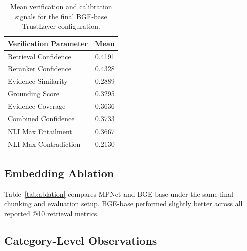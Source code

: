 \documentclass[11pt]{article}
\newcommand{\tablefont}{\footnotesize}
\begin{document}
\begin{table}[t]
\centering
\tablefont
\setlength{\tabcolsep}{3pt}
\begin{tabular}{p{}r}
\hline
\textbf{Verification Parameter} & \textbf{Mean} \\
\hline
Retrieval Confidence & 0.4191 \\
Reranker Confidence & 0.4328 \\
Evidence Similarity & 0.2889 \\
Grounding Score & 0.3295 \\
Evidence Coverage & 0.3636 \\
Combined Confidence & 0.3733 \\
NLI Max Entailment & 0.3667 \\
NLI Max Contradiction & 0.2130 \\
\hline
\end{tabular}
\caption{Mean verification and calibration signals for the final BGE-base TrustLayer configuration.}
\label{tab:verification}
\end{table}

\subsection{Embedding Ablation}

Table~\ref{tab:ablation} compares MPNet and BGE-base under the same final chunking and evaluation setup. BGE-base performed slightly better across all reported @10 retrieval metrics.

\begin{table}[t]
\centering
\tablefont
\setlength{\tabcolsep}{2pt}
\caption{Embedding ablation on the final cleaned evaluation set.}
\label{tab:ablation}
\end{table}

\subsection{Category-Level Observations}
\end{document}

